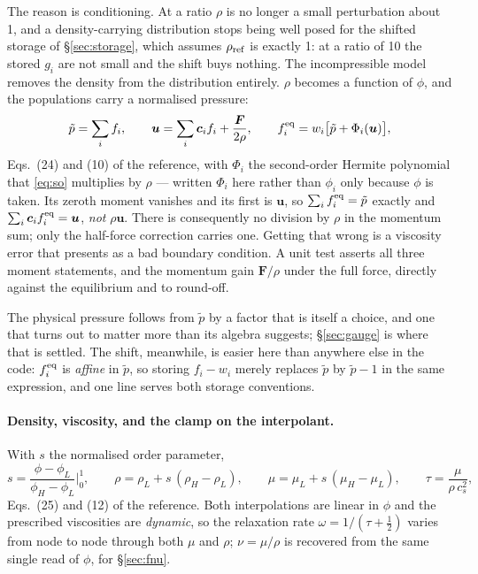 \documentclass[11pt,a4paper]{article}
\newcommand{\cs}{c_s}
\newcommand{\ci}{\bm{c}_i}
\newcommand{\uu}{\bm{u}}
\begin{document}
The reason is conditioning. At a ratio $\rho$ is no longer a small perturbation
about 1, and a density-carrying distribution stops being well posed for the
shifted storage of \S\ref{sec:storage}, which assumes $\rho_{\rm ref}$ is exactly
1: at a ratio of 10 the stored $g_i$ are not small and the shift buys nothing.
The incompressible model removes the density from the distribution entirely.
$\rho$ becomes a function of $\phi$, and the populations carry a normalised
pressure:
\begin{equation}
  \tilde p = \sum_i f_i,
  \qquad
  \uu = \sum_i \ci f_i + \frac{\bm{F}}{2\rho},
  \qquad
  f_i^{\rm eq} = w_i\big[\tilde p + \Phi_i(\uu)\big],
  \label{eq:pmoments}
\end{equation}
Eqs.~(24) and (10) of the reference, with $\Phi_i$ the second-order Hermite
polynomial that \eqref{eq:so} multiplies by $\rho$ --- written $\Phi_i$ here
rather than $\phi_i$ only because $\phi$ is taken. Its zeroth moment vanishes and
its first is $\uu$, so $\sum_i f_i^{\rm eq} = \tilde p$ exactly and
$\sum_i \ci f_i^{\rm eq} = \uu$, \emph{not} $\rho\uu$. There is consequently no
division by $\rho$ in the momentum sum; only the half-force correction carries
one. Getting that wrong is a viscosity error that presents as a bad boundary
condition. A unit test asserts all three moment statements, and the momentum gain
$\bm{F}/\rho$ under the full force, directly against the equilibrium and to
round-off.

The physical pressure follows from $\tilde p$ by a factor that is itself a
choice, and one that turns out to matter more than its algebra suggests;
\S\ref{sec:gauge} is where that is settled. The shift, meanwhile, is easier here
than anywhere else in the code: $f_i^{\rm eq}$ is \emph{affine} in $\tilde p$, so
storing $f_i - w_i$ merely replaces $\tilde p$ by $\tilde p - 1$ in the same
expression, and one line serves both storage conventions.

\paragraph{Density, viscosity, and the clamp on the interpolant.} With
$s$ the normalised order parameter,
\begin{equation}
  s = \frac{\phi-\phi_L}{\phi_H-\phi_L}\bigg|_{0}^{1},
  \qquad
  \rho = \rho_L + s\,(\rho_H-\rho_L),
  \qquad
  \mu = \mu_L + s\,(\mu_H-\mu_L),
  \qquad
  \tau = \frac{\mu}{\rho\,\cs^2},
  \label{eq:interp}
\end{equation}
Eqs.~(25) and (12) of the reference. Both interpolations are linear in $\phi$ and
the prescribed viscosities are \emph{dynamic}, so the relaxation rate
$\omega = 1/(\tau+\tfrac12)$ varies from node to node through both $\mu$ and
$\rho$; $\nu = \mu/\rho$ is recovered from the same single read of $\phi$, for
\S\ref{sec:fnu}.
\end{document}
